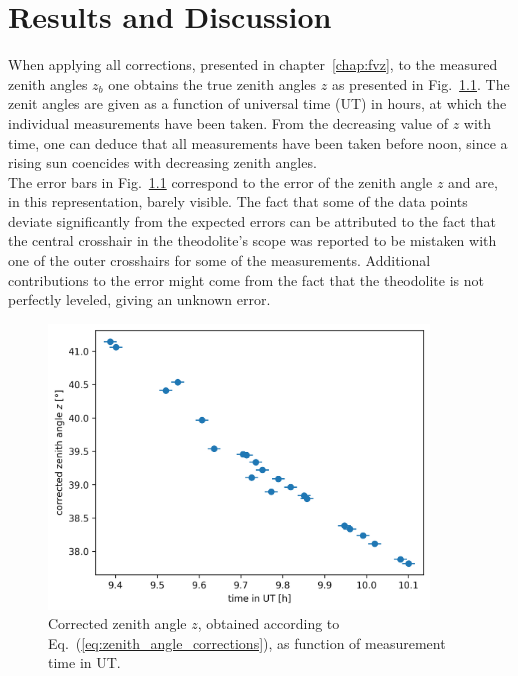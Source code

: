
\chapter{Results and Discussion}

When applying all corrections, presented in chapter~\ref{chap:fvz}, to the measured zenith angles $z_b$ one obtains the true zenith angles $z$ as presented in Fig.~\ref{fig:zenith}. The zenit angles are given as a function of universal time (UT) in hours, at which the individual measurements have been taken. 
From the decreasing value of $z$ with time, one can deduce that all measurements have been taken before noon, since a rising sun coencides with decreasing zenith angles. \\ The error bars in Fig.~\ref{fig:zenith} correspond to the error of the zenith angle $z$ and are, in this representation, barely visible. The fact that some of the data points deviate significantly from the expected errors can be attributed to the fact that the central crosshair in the theodolite's scope was reported to be mistaken with one of the outer crosshairs for some of the measurements. Additional contributions to the error might come from the fact that the theodolite is not perfectly leveled, giving an unknown error.\\


\begin{figure}[]
    \centering
    \includegraphics[width=0.9\textwidth]{05-Fazit/zenith_angle_plot.png}
    \caption{Corrected zenith angle $z$, obtained according to Eq.~(\ref{eq:zenith_angle_corrections}), as function of measurement time in UT.}
    \label{fig:zenith}
\end{figure}

